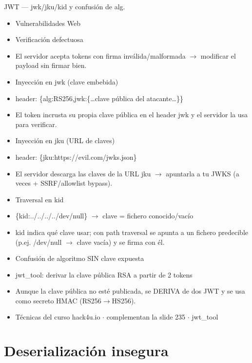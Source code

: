 \documentclass[aspectratio=169,10pt]{beamer}
\begin{document}
\begin{frame}[allowframebreaks]{JWT --- jwk/jku/kid y confusión de alg.}
\small
  \begin{itemize}
  \item Vulnerabilidades Web
  \item Verificación defectuosa
  \item El servidor acepta tokens con firma inválida/malformada $\rightarrow$ modificar el payload sin firmar bien.
  \item Inyección en jwk (clave embebida)
  \item header: \{\textquotedbl{}alg\textquotedbl{}:\textquotedbl{}RS256\textquotedbl{},\textquotedbl{}jwk\textquotedbl{}:\{\dots{}clave pública del atacante\dots{}\}\}
  \item El token incrusta su propia clave pública en el header jwk y el servidor la usa para verificar.
  \item Inyección en jku (URL de claves)
  \item header: \{\textquotedbl{}jku\textquotedbl{}:\textquotedbl{}https://evil.com/jwks.json\textquotedbl{}\}
  \item El servidor descarga las claves de la URL jku $\rightarrow$ apuntarla a tu JWKS (a veces + SSRF/allowlist bypass).
  \item Traversal en kid
  \item \{\textquotedbl{}kid\textquotedbl{}:\textquotedbl{}../../../../dev/null\textquotedbl{}\} $\rightarrow$ clave = fichero conocido/vacío
  \item kid indica qué clave usar; con path traversal se apunta a un fichero predecible (p.ej. /dev/null $\rightarrow$ clave vacía) y se firma con él.
  \item Confusión de algoritmo SIN clave expuesta
  \item jwt\_tool: derivar la clave pública RSA a partir de 2 tokens
  \item Aunque la clave pública no esté publicada, se DERIVA de dos JWT y se usa como secreto HMAC (RS256$\rightarrow$HS256).
  \item Técnicas del curso hack4u.io $\cdot$ complementan la slide 235 $\cdot$ jwt\_tool
  \end{itemize}
\end{frame}

\section{Deserialización insegura}
\end{document}
